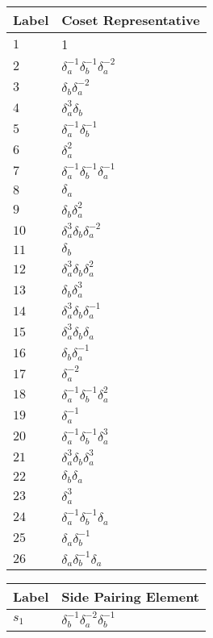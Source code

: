 \documentclass{article}
\begin{document}

\begin{center}
\begin{tabular}{ll}
\toprule
Label & Coset Representative\\
\midrule
$1$ & 1 \\
$2$ & $\delta_a^{-1}\delta_b^{-1}\delta_a^{-2}$ \\
$3$ & $\delta_b^{}\delta_a^{-2}$ \\
$4$ & $\delta_a^{3}\delta_b^{}$ \\
$5$ & $\delta_a^{-1}\delta_b^{-1}$ \\
$6$ & $\delta_a^{2}$ \\
$7$ & $\delta_a^{-1}\delta_b^{-1}\delta_a^{-1}$ \\
$8$ & $\delta_a^{}$ \\
$9$ & $\delta_b^{}\delta_a^{2}$ \\
$10$ & $\delta_a^{3}\delta_b^{}\delta_a^{-2}$ \\
$11$ & $\delta_b^{}$ \\
$12$ & $\delta_a^{3}\delta_b^{}\delta_a^{2}$ \\
$13$ & $\delta_b^{}\delta_a^{3}$ \\
$14$ & $\delta_a^{3}\delta_b^{}\delta_a^{-1}$ \\
$15$ & $\delta_a^{3}\delta_b^{}\delta_a^{}$ \\
$16$ & $\delta_b^{}\delta_a^{-1}$ \\
$17$ & $\delta_a^{-2}$ \\
$18$ & $\delta_a^{-1}\delta_b^{-1}\delta_a^{2}$ \\
$19$ & $\delta_a^{-1}$ \\
$20$ & $\delta_a^{-1}\delta_b^{-1}\delta_a^{3}$ \\
$21$ & $\delta_a^{3}\delta_b^{}\delta_a^{3}$ \\
$22$ & $\delta_b^{}\delta_a^{}$ \\
$23$ & $\delta_a^{3}$ \\
$24$ & $\delta_a^{-1}\delta_b^{-1}\delta_a^{}$ \\
$25$ & $\delta_a^{}\delta_b^{-1}$ \\
$26$ & $\delta_a^{}\delta_b^{-1}\delta_a^{}$ \\
\bottomrule
\end{tabular}
\hfill
\begin{tabular}{ll}
\toprule
Label & Side Pairing Element\\
\midrule
$s_{1}$ & $\delta_b^{-1}\delta_a^{-2}\delta_b^{-1}$ \\

\end{tabular}
\end{center}
\end{document}
